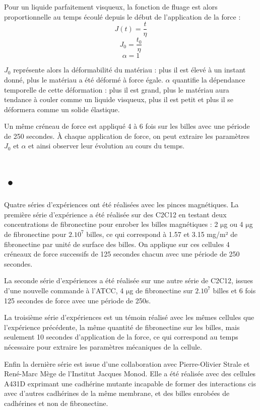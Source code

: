 \documentclass{report}
\newcommand{\micro}{$\mathrm{\mu}$}
\begin{document}
 Pour un liquide parfaitement visqueux, la fonction de fluage est alors  proportionnelle au temps écoulé depuis le début de l'application de la force : 
 $$ J(t)=\frac{t}{\eta}$$
 $$J_0=\frac{t_0}{\eta}$$
 $$\alpha=1$$
 
 $J_0$ représente alors la déformabilité du matériau : plus il est élevé à un instant donné, plus le matériau a été déformé à force égale. 
 $\alpha$ quantifie la dépendance temporelle de cette déformation : plus il est grand, plus le matériau aura tendance à couler comme un liquide visqueux, plus il est petit et plus il se déformera comme un solide élastique. 

Un même créneau de force est appliqué 4 à 6 fois sur les billes avec une période de 250 secondes. 
À chaque application de force, on peut extraire les paramètres $J_0$ et $\alpha$ et ainsi observer leur évolution au cours du temps. 

\section{•}

Quatre séries d'expériences ont été réalisées avec les pinces magnétiques.
La première série d'expérience a été réalisée sur des C2C12 en testant deux concentrations de fibronectine pour enrober les billes magnétiques : 2 \micro g ou  4 \micro g de fibronectine pour $2.10^7$ billes, ce qui correspond à 1.57 et 3.15 mg/m² de fibronectine par unité de surface des billes. 
On applique sur ces cellules 4 créneaux de force successifs de 125 secondes chacun avec une période de 250 secondes. 

La seconde série d'expériences a été réalisée sur une autre série de C2C12, issues d'une nouvelle commande à l'ATCC, 4 \micro g de fibronectine sur $2.10^7$ billes et 6 fois 125 secondes de force avec une période de 250s. 

La troisième série d'expériences est un témoin réalisé avec les mêmes cellules que l'expérience précédente, la même quantité de fibronectine sur les billes, mais seulement 10 secondes d'application de la force, ce qui correspond au temps nécessaire pour extraire les paramètres mécaniques de la cellule. 


Enfin la dernière série est issue d'une collaboration avec Pierre-Olivier Strale et René-Marc Mège de l'Institut Jacques Monod. Elle a été réalisée avec des cellules A431D exprimant une cadhérine mutante incapable de former des interactions cis avec d'autres cadhérines de la même membrane, et des billes enrobées de cadhérines et non de fibronectine. 
\end{document}
